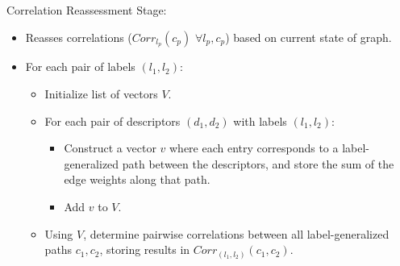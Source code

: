 \documentclass[a4paper]{article}
\begin{document}
\begin{itemize}
\begin{itemize}
\begin{itemize}
\begin{itemize}
            \end{itemize}
        \end{itemize}
    \end{itemize}
    Correlation Reassessment Stage:
    \begin{itemize}
        \item Reasses correlations ($Corr_{l_p}(c_p)$ $\forall l_p, c_p$) based
            on current state of graph.
        \item For each pair of labels $(l_1, l_2)$:
        \begin{itemize}
            \item Initialize list of vectors $V$.
            \item For each pair of descriptors $(d_1, d_2)$ with labels $(l_1,
                l_2)$:
            \begin{itemize}
                \item Construct a vector $v$ where each entry corresponds to a
                    label-generalized path between the descriptors, and store
                    the sum of the edge weights along that path.
                \item Add $v$ to $V$.
            \end{itemize}
            \item Using $V$, determine pairwise correlations between all
                label-generalized paths $c_1, c_2$, storing results in 
                $Corr_{(l_1, l_2)}(c_1, c_2)$.
        \end{itemize}
    \end{itemize}
\end{itemize}
\end{document}
